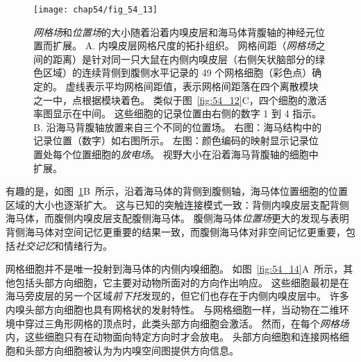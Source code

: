 \begin{figure}[htbp]
	\centering
	\texttt{[image: chap54/fig\_54\_13]}
	\caption{\textit{网格场}和\textit{位置场}的大小随着沿着内嗅皮层和海马体背腹轴的神经元位置而扩展。
		A. 内嗅皮层网格尺度的拓扑组织。
		网格间距（\textit{网格场}之间的距离）是针对同一只大鼠在内侧内嗅皮层（右侧矢状脑部分的绿色区域）的连续背侧到腹侧水平记录的 49 个网格细胞（彩色点）确定的。
		虚线表示平均网格间距值，表示网格间距落在四个离散模块之一中，点根据模块着色。
		类似于图~\ref{fig:54_12}C，四个细胞的激活率图显示在中间。
		这些细胞的记录位置由右侧的数字 1 到 4 指示\cite{stensola2012entorhinal}。
		B. 沿海马背腹轴放置来自三个不同的位置场。
		右图：海马结构中的记录位置（数字）如右图所示。
		左图：颜色编码的映射显示记录位置处每个位置细胞的\textit{放电场}。
		视野大小在沿着海马背腹轴的细胞中扩展\cite{kjelstrup2008finite}。}
	\label{fig:54_13}
\end{figure}


有趣的是，如图~\ref{fig:54_13}B~所示，沿着海马体的背侧到腹侧轴，海马体位置细胞的位置区域的大小也逐渐扩大。
这与已知的突触连接模式一致：背侧内嗅皮层支配背侧海马体，而腹侧内嗅皮层支配腹侧海马体。
腹侧海马体\textit{位置场}更大的发现与表明背侧海马体对空间记忆更重要的结果一致，而腹侧海马体对非空间记忆更重要，包括\textit{社交记忆}和情绪行为。


网格细胞并不是唯一投射到海马体的内侧内嗅细胞。
如图~\ref{fig:54_14}A~所示，其他包括头部方向细胞，它主要对动物所面对的方向作出响应。
这些细胞最初是在海马旁皮层的另一个区域\textit{前下托}发现的，但它们也存在于内侧内嗅皮层中。
许多内嗅头部方向细胞也具有网格状的发射特性。
与网格细胞一样，当动物在二维环境中穿过三角形网格的顶点时，此类头部方向细胞会激活。
然而，在每个\textit{网格场}内，这些细胞只有在动物面向特定方向时才会放电。
头部方向细胞和连接网格细胞和头部方向细胞被认为为内嗅空间图提供方向信息。


